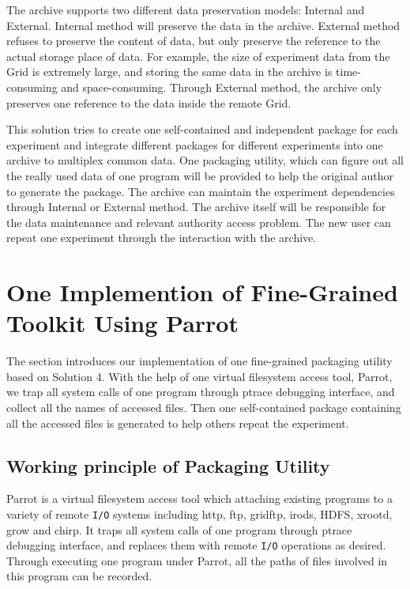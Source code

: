 \documentclass{acm_proc_article-sp}
\begin{document}
The archive supports two different data preservation models: Internal and External. Internal method will preserve the data in the archive. External method refuses to preserve the content of data, but only preserve the reference to the actual storage place of data. For example, the size of experiment data from the Grid is extremely large, and storing the same data in the archive is time-consuming and space-consuming. Through External method, the archive only preserves one reference to the data inside the remote Grid.

This solution tries to create one self-contained and independent package for
each experiment and integrate different packages for different experiments into
one archive to multiplex common data. One packaging utility, which can figure out all the really used data of one program  will be provided
to help the original author to generate the package. The archive can maintain
the experiment dependencies through Internal or External method. The archive
itself will be responsible for the data maintenance and relevant authority
access problem. The new user can repeat one experiment through the
interaction with the archive.

\section{One Implemention of Fine-Grained Toolkit Using Parrot}

The section introduces our implementation of one fine-grained packaging utility based on Solution 4. With the help of one
virtual filesystem access tool, Parrot, we trap all system calls of one
program through ptrace debugging interface, and collect all the names of accessed files. 
Then one self-contained package containing all the accessed files is generated to help others repeat the experiment.

\subsection{Working principle of Packaging Utility} 

Parrot is a virtual filesystem access tool which attaching existing programs to
a variety of remote {\tt I/O} systems including http, ftp, gridftp, irods, HDFS,
xrootd, grow and chirp. It traps all system calls of one program through ptrace
debugging interface, and replaces them with remote {\tt I/O} operations as desired.
Through executing one program under Parrot, all the paths of files involved in
this program can be recorded.  
\end{document}
